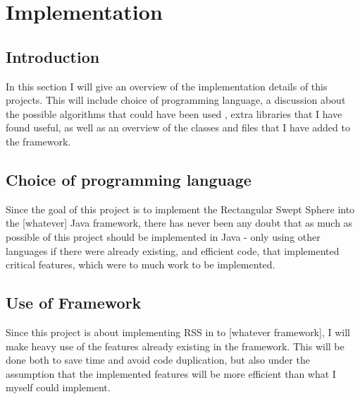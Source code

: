 
\section{Implementation}
\label{implementation}

\subsection{Introduction}
In this section I will give an overview of the implementation details of this projects. This will include choice of programming language, a discussion about the possible algorithms that could have been used , extra libraries that I have found useful, as well as an overview of the classes and files that I have added to the framework.

\subsection{Choice of programming language}
Since the goal of this project is to implement the Rectangular Swept Sphere into the [whatever]  Java framework, there has never been any doubt that as much as possible of this project should be implemented in Java - only using other languages if there were already existing, and efficient code, that implemented critical features, which were to much work to be implemented.

\subsection{Use of Framework}
Since this project is about implementing RSS in to [whatever framework], I will make heavy use of the features already existing in the framework. This will be done both to save time and avoid code duplication, but also under the assumption that the implemented features will be more efficient than what I myself could implement.

